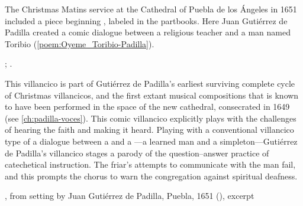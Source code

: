 The Christmas Matins service at the Cathedral of Puebla de los Ángeles in 1651
included a piece beginning , labeled  in
the partbooks. 
Here Juan Gutiérrez de Padilla created a comic dialogue between a religious
teacher and a  man named Toribio
(\cref{poem:Oyeme_Toribio-Padilla}).%
\begin{Footnote}
    ; \Autocites{Stanford:Catalog}{Puebla:Microfilm}.
\end{Footnote}
This villancico is part of Gutiérrez de Padilla's earliest surviving complete
cycle of Christmas villancicos, and the first extant musical compositions that
is known to have been performed in the space of the new cathedral, consecrated
in 1649 (see \cref{ch:padilla-voces}).
This comic  villancico explicitly plays with the challenges of
hearing the faith and making it heard.
Playing with a conventional villancico type of a dialogue between a
 and a ---a learned man and a
simpleton---Gutiérrez de Padilla's villancico stages a parody of the
question--answer practice of catechetical instruction.
The friar's attempts to communicate with the  man fail, and this
prompts the chorus to warn the congregation against spiritual deafness.

{, from setting by Juan Gutiérrez de Padilla,
Puebla, 1651 (), excerpt}

